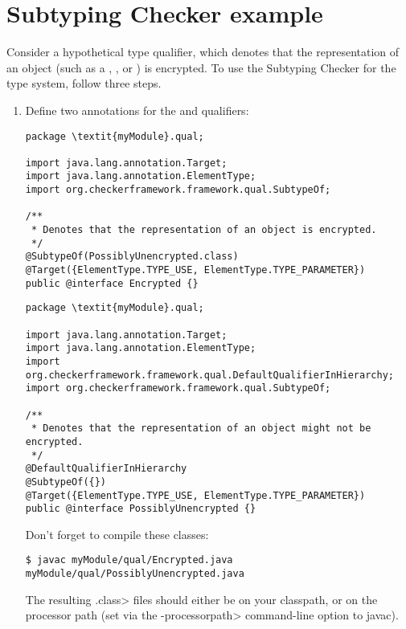 \section{Subtyping Checker example\label{subtyping-example}\label{encrypted-example}}

Consider a hypothetical  type qualifier, which denotes that the
representation of an object (such as a , , or
) is encrypted. To use the Subtyping Checker for the 
type system, follow three steps.

\begin{enumerate}
\item
 Define two annotations for the  and  qualifiers:

\begin{Verbatim}
package \textit{myModule}.qual;

import java.lang.annotation.Target;
import java.lang.annotation.ElementType;
import org.checkerframework.framework.qual.SubtypeOf;

/**
 * Denotes that the representation of an object is encrypted.
 */
@SubtypeOf(PossiblyUnencrypted.class)
@Target({ElementType.TYPE_USE, ElementType.TYPE_PARAMETER})
public @interface Encrypted {}
\end{Verbatim}

\begin{Verbatim}
package \textit{myModule}.qual;

import java.lang.annotation.Target;
import java.lang.annotation.ElementType;
import org.checkerframework.framework.qual.DefaultQualifierInHierarchy;
import org.checkerframework.framework.qual.SubtypeOf;

/**
 * Denotes that the representation of an object might not be encrypted.
 */
@DefaultQualifierInHierarchy
@SubtypeOf({})
@Target({ElementType.TYPE_USE, ElementType.TYPE_PARAMETER})
public @interface PossiblyUnencrypted {}
\end{Verbatim}

Don't forget to compile these classes:

\begin{Verbatim}
$ javac myModule/qual/Encrypted.java myModule/qual/PossiblyUnencrypted.java
\end{Verbatim}

The resulting \<.class> files should either be on your classpath, or on the
processor path (set via the \<-processorpath> command-line option to javac).


\end{enumerate}
